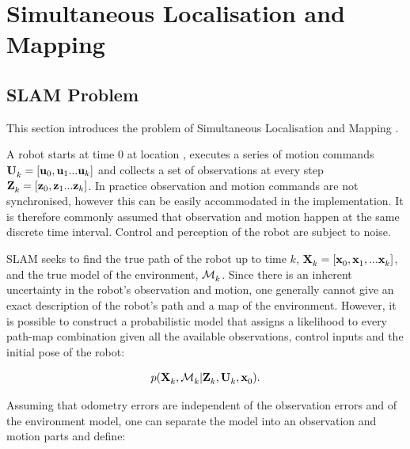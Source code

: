 \section{Simultaneous Localisation and Mapping}
\label{sec:SLAM}

\subsection{SLAM Problem}

This section introduces the problem of Simultaneous Localisation and
Mapping \cite{smith1990eus,thrun2003rms}. 

A robot starts at time 0 at location , executes a series of
motion commands ${\bf U}^{}_{k} = [{\bf u}_{0},{\bf u}_{1}...{\bf u}_{k}]$ and collects a
set of observations at every step
${\bf Z}^{}_{k}=[{\bf z}_{0},{\bf z}_{1}...{\bf z}_{k}]$. In practice observation and motion
commands are not synchronised, however this can be easily accommodated
in the implementation. It is therefore commonly assumed that
observation and motion happen at the same discrete time interval.
Control and perception of the robot are subject to noise.

SLAM seeks to find the true path of the robot up to time $k$,
$\Xall{k}{}{} = [\x{0}{}{}, \x{1}{}{}, ... \x{k}{}{}]$, and the true
model of the environment, $\map{k}{}{}$. Since there is an inherent
uncertainty in the robot's observation and motion, one generally
cannot give an exact description of the robot's path and a map of the
environment. However, it is possible to construct a probabilistic
model that assigns a likelihood to every path-map combination given
all the available observations, control inputs and the initial pose of
the robot:

\begin{equation}
 p(\Xall{k}{}{}, \map{k}{}{} | \Zall{k}{}, \Uall{k}{}, \x{0}{}{}).
\label{eqn:map}
\end{equation}

Assuming that odometry errors are independent of the observation
errors and of the environment model, one can separate the model into
an observation and motion parts and define:

